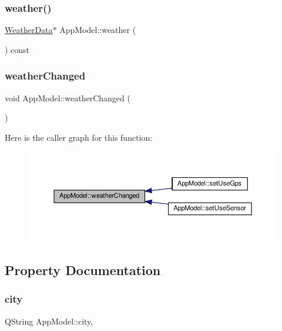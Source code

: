 \subsubsection{\texorpdfstring{weather()}{weather()}}
{\footnotesize\ttfamily \hyperlink{class_weather_data}{Weather\+Data}$\ast$ App\+Model\+::weather (\begin{DoxyParamCaption}{ }\end{DoxyParamCaption}) const}

\mbox{\label{class_app_model_a83e61455ed5672333b0db45f3f86417c}} 
\subsubsection{\texorpdfstring{weather\+Changed}{weatherChanged}}
{\footnotesize\ttfamily void App\+Model\+::weather\+Changed (\begin{DoxyParamCaption}{ }\end{DoxyParamCaption})\hspace{0.3cm}{\ttfamily [signal]}}

Here is the caller graph for this function\+:
\nopagebreak
\begin{figure}[H]
\begin{center}
\leavevmode
\includegraphics[width=350pt]{class_app_model_a83e61455ed5672333b0db45f3f86417c_icgraph}
\end{center}
\end{figure}


\subsection{Property Documentation}
\mbox{\label{class_app_model_aa6915cabdaaf04805e00b5a2f75311e8}} 
\subsubsection{\texorpdfstring{city}{city}}
{\footnotesize\ttfamily Q\+String App\+Model\+::city\hspace{0.3cm}{\ttfamily [read]}, {\ttfamily [write]}}

